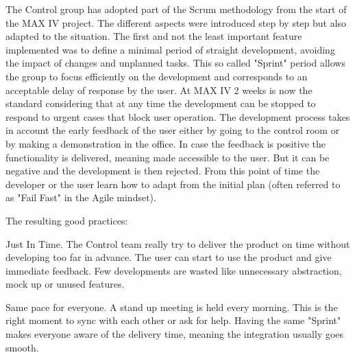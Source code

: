 \documentclass[a4paper,
              ]{jacow}
\begin{document}
The Control group has adopted part of the Scrum methodology from the start of the MAX IV project. The different aspects were introduced step by step but also adapted to the situation. The first and not the least important feature implemented was to define a minimal period of straight development, avoiding the impact of changes and unplanned tasks.
This so called "Sprint" period allows the group to focus efficiently on the development and corresponds to an acceptable delay of response by the user. At MAX IV 2 weeks is now the standard considering that at any time the development can be stopped to respond to urgent cases that block user operation.
The development process takes in account the early feedback of the user either by going to the control room or by making a demonstration in the office. In case the feedback is positive the functionality is delivered, meaning made accessible to the user. But it can be negative and the development is then rejected. From this point of time the developer or the user learn how to adapt from the initial plan (often referred to as "Fail Fast" in the Agile mindset).

The resulting good practices:
\begin{Itemize}
      \item Just In Time.
      The Control team really try to deliver the product on time without developing too far in advance. The user can start to use the product and give immediate feedback. Few developments are wasted like unnecessary abstraction, mock up or unused features.
      \item Same pace for everyone.
      A stand up meeting is held every morning. This is the right moment to sync with each other or ask for help. Having the same "Sprint" makes everyone aware of the delivery time, meaning the integration usually goes smooth. 
\end{Itemize}
\end{document}
